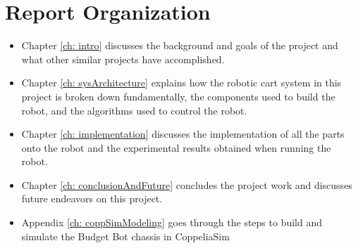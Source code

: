 \section{Report Organization}
\begin{itemize}
    \item Chapter \ref{ch: intro} discusses the background and goals of the project and what other similar projects have accomplished.
    \item Chapter \ref{ch: sysArchitecture} explains how the robotic cart system in this project is broken down fundamentally, the components used to build the robot, and the algorithms used to control the robot.
    \item Chapter \ref{ch: implementation} discusses the implementation of all the parts onto the robot and the experimental results obtained when running the robot.
    \item Chapter \ref{ch: conclusionAndFuture} concludes the project work and discusses future endeavors on this project.
    \item Appendix \ref{ch: coppSimModeling} goes through the steps to build and simulate the Budget Bot chassis in CoppeliaSim
\end{itemize}

